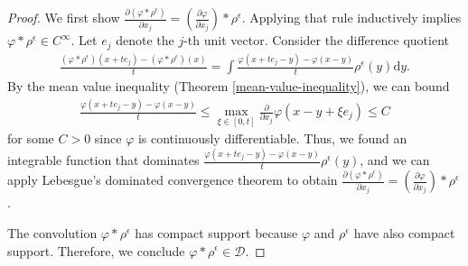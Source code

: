 \begin{proof}
    We first show $\frac{\partial (\varphi * \rho^{\epsilon})}{\partial x_j} = \left(\frac{\partial \varphi}{\partial x_j}\right) * \rho^{\epsilon}$. Applying that rule inductively implies $\varphi * \rho^{\epsilon} \in C^{\infty}$. Let $e_j$ denote the $j$-th unit vector. Consider the difference quotient
    \begin{align*}
        \frac{(\varphi * \rho^\epsilon)(x + te_j) - (\varphi * \rho^\epsilon)(x)}{t} = \int \frac{\varphi(x+te_j - y) - \varphi(x-y)}{t}\rho^{\epsilon}(y) \mathrm{d}y.
    \end{align*}
    By the mean value inequality (Theorem \ref{mean-value-inequality}), we can bound
    \begin{align*}
        \frac{\varphi (x + te_j - y) - \varphi (x-y)}{t} \leq \max_{\xi \in [0,t]}\frac{\partial}{\partial x_j}\varphi(x - y + \xi e_j) \leq C
    \end{align*}
    for some $C > 0$ since $\varphi$ is continuously differentiable. Thus, we found an integrable function that dominates $\frac{\varphi(x+te_j - y) - \varphi(x-y)}{t}\rho^{\epsilon}(y)$, and we can apply Lebesgue's dominated convergence theorem to obtain $\frac{\partial (\varphi * \rho^{\epsilon})}{\partial x_j} = \left(\frac{\partial \varphi}{\partial x_j}\right) * \rho^{\epsilon}$.

    The convolution $\varphi * \rho^{\epsilon}$ has compact support because $\varphi$ and $\rho^{\epsilon}$ have also compact support. Therefore, we conclude $\varphi * \rho^{\epsilon} \in \mathcal{D}$.


\end{proof}
